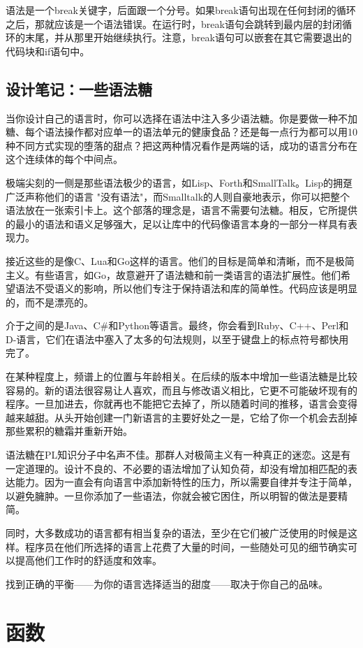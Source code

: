 \documentclass[cn,11pt,chinese]{elegantbook}
\begin{document}
语法是一个break关键字，后面跟一个分号。如果break语句出现在任何封闭的循环之后，那就应该是一个语法错误。在运行时，break语句会跳转到最内层的封闭循环的末尾，并从那里开始继续执行。注意，break语句可以嵌套在其它需要退出的代码块和if语句中。

\section{设计笔记：一些语法糖}

当你设计自己的语言时，你可以选择在语法中注入多少语法糖。你是要做一种不加糖、每个语法操作都对应单一的语法单元的健康食品？还是每一点行为都可以用10种不同方式实现的堕落的甜点？把这两种情况看作是两端的话，成功的语言分布在这个连续体的每个中间点。

极端尖刻的一侧是那些语法极少的语言，如Lisp、Forth和SmallTalk。Lisp的拥趸广泛声称他们的语言 "没有语法"，而Smalltalk的人则自豪地表示，你可以把整个语法放在一张索引卡上。这个部落的理念是，语言不需要句法糖。相反，它所提供的最小的语法和语义足够强大，足以让库中的代码像语言本身的一部分一样具有表现力。

接近这些的是像C、Lua和Go这样的语言。他们的目标是简单和清晰，而不是极简主义。有些语言，如Go，故意避开了语法糖和前一类语言的语法扩展性。他们希望语法不受语义的影响，所以他们专注于保持语法和库的简单性。代码应该是明显的，而不是漂亮的。

介于之间的是Java、C\#和Python等语言。最终，你会看到Ruby、C++、Perl和D-语言，它们在语法中塞入了太多的句法规则，以至于键盘上的标点符号都快用完了。

在某种程度上，频谱上的位置与年龄相关。在后续的版本中增加一些语法糖是比较容易的。新的语法很容易让人喜欢，而且与修改语义相比，它更不可能破坏现有的程序。一旦加进去，你就再也不能把它去掉了，所以随着时间的推移，语言会变得越来越甜。从头开始创建一门新语言的主要好处之一是，它给了你一个机会去刮掉那些累积的糖霜并重新开始。

语法糖在PL知识分子中名声不佳。那群人对极简主义有一种真正的迷恋。这是有一定道理的。设计不良的、不必要的语法增加了认知负荷，却没有增加相匹配的表达能力。因为一直会有向语言中添加新特性的压力，所以需要自律并专注于简单，以避免臃肿。一旦你添加了一些语法，你就会被它困住，所以明智的做法是要精简。

同时，大多数成功的语言都有相当复杂的语法，至少在它们被广泛使用的时候是这样。程序员在他们所选择的语言上花费了大量的时间，一些随处可见的细节确实可以提高他们工作时的舒适度和效率。

找到正确的平衡——为你的语言选择适当的甜度——取决于你自己的品味。

\chapter{函数}
\end{document}
